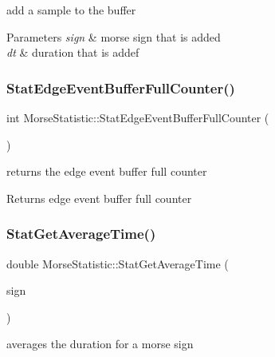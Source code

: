 add a sample to the buffer 


\begin{DoxyParams}{Parameters}
{\em sign} & morse sign that is added \\
\hline
{\em dt} & duration that is addef \\
\hline
\end{DoxyParams}
\mbox{\label{classMorseStatistic_a92064ea196420fa75a5950a8bdab874e}} 
\subsubsection{\texorpdfstring{Stat\+Edge\+Event\+Buffer\+Full\+Counter()}{StatEdgeEventBufferFullCounter()}}
{\footnotesize\ttfamily int Morse\+Statistic\+::\+Stat\+Edge\+Event\+Buffer\+Full\+Counter (\begin{DoxyParamCaption}{ }\end{DoxyParamCaption})}



returns the edge event buffer full counter 

\begin{DoxyReturn}{Returns}
edge event buffer full counter 
\end{DoxyReturn}
\mbox{\label{classMorseStatistic_a3347edf33028378ec2009a67c7f5b14d}} 
\subsubsection{\texorpdfstring{Stat\+Get\+Average\+Time()}{StatGetAverageTime()}}
{\footnotesize\ttfamily double Morse\+Statistic\+::\+Stat\+Get\+Average\+Time (\begin{DoxyParamCaption}\item[{Morse\+::\+Morse\+Sign}]{sign }\end{DoxyParamCaption})}



averages the duration for a morse sign 


